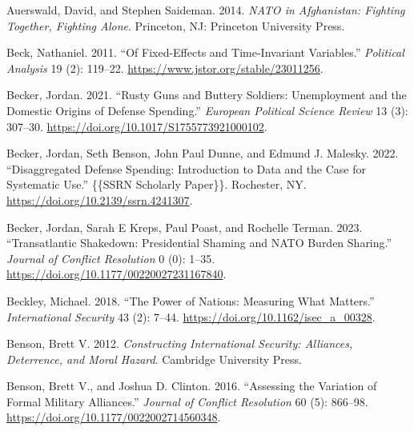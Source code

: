 \documentclass[
  12,
  letterpaper,
  DIV=11,
  numbers=noendperiod]{scrartcl}
\newlength{\cslhangindent}
\newlength{\cslentryspacingunit} %
\newenvironment{CSLReferences}[2] %
 {%
  \setlength{\parindent}{0pt}
  \ifodd #1
  \let\oldpar\par
  \def\par{\hangindent=\cslhangindent\oldpar}
  \fi
  \setlength{\parskip}{#2\cslentryspacingunit}
 }%
 {}
\begin{document}
\begin{CSLReferences}{1}{0}
\leavevmode{}%
Auerswald, David, and Stephen Saideman. 2014. \emph{{NATO} in
{Afghanistan}: {Fighting Together}, {Fighting Alone}}. {Princeton, NJ}:
{Princeton University Press}.

\leavevmode{}%
Beck, Nathaniel. 2011. {``Of {Fixed-Effects} and {Time-Invariant
Variables}.''} \emph{Political Analysis} 19 (2): 119--22.
\url{https://www.jstor.org/stable/23011256}.

\leavevmode{}%
Becker, Jordan. 2021. {``Rusty Guns and Buttery Soldiers: Unemployment
and the Domestic Origins of Defense Spending.''} \emph{European
Political Science Review} 13 (3): 307--30.
\url{https://doi.org/10.1017/S1755773921000102}.

\leavevmode{}%
Becker, Jordan, Seth Benson, John Paul Dunne, and Edmund J. Malesky.
2022. {``Disaggregated {Defense Spending}: {Introduction} to {Data} and
the {Case} for {Systematic Use}.''} \{\{SSRN Scholarly Paper\}\}.
{Rochester, NY}. \url{https://doi.org/10.2139/ssrn.4241307}.

\leavevmode{}%
Becker, Jordan, Sarah E Kreps, Paul Poast, and Rochelle Terman. 2023.
{``Transatlantic {Shakedown}: {Presidential Shaming} and {NATO Burden
Sharing}.''} \emph{Journal of Conflict Resolution} 0 (0): 1--35.
\url{https://doi.org/10.1177/00220027231167840}.

\leavevmode{}%
Beckley, Michael. 2018. {``The {Power} of {Nations}: {Measuring What
Matters}.''} \emph{International Security} 43 (2): 7--44.
\url{https://doi.org/10.1162/isec_a_00328}.

\leavevmode{}%
Benson, Brett V. 2012. \emph{Constructing {International Security}:
{Alliances}, {Deterrence}, and {Moral Hazard}}. {Cambridge University
Press}.

\leavevmode{}%
Benson, Brett V., and Joshua D. Clinton. 2016. {``Assessing the
{Variation} of {Formal Military Alliances}.''} \emph{Journal of Conflict
Resolution} 60 (5): 866--98.
\url{https://doi.org/10.1177/0022002714560348}.


\end{CSLReferences}
\end{document}
